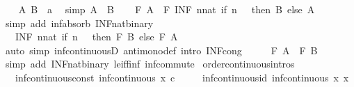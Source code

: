 \begin{isabellebody}
%
\isadelimproof
%
\endisadelimproof
%
\isatagproof
{}\isamarkupfalse%
\isanewline
\ \ \isamarkupfalse%
\ A\ B\ {\isacharcolon}{\isacharcolon}\ {\isachardoublequoteopen}{\isacharprime}a{\isachardoublequoteclose}\ \isamarkupfalse%
\ {\isacharbrackleft}simp{\isacharbrackright}{\isacharcolon}\ {\isachardoublequoteopen}A\ {\isasymle}\ B{\isachardoublequoteclose}\isanewline
\ \ \isamarkupfalse%
\ {\isachardoublequoteopen}F\ A\ {\isacharequal}\ F\ {\isacharparenleft}INF\ n{\isacharcolon}{\isacharcolon}nat{\isachardot}\ if\ n\ {\isacharequal}\ {}\ then\ B\ else\ A{\isacharparenright}{\isachardoublequoteclose}\isanewline
\ \ \ \ \isamarkupfalse%
\ {\isacharparenleft}simp\ add{\isacharcolon}\ inf{\isacharunderscore}absorb{}\ INF{\isacharunderscore}nat{\isacharunderscore}binary{\isacharparenright}\isanewline
\ \ \isamarkupfalse%
\ \isamarkupfalse%
\ {\isachardoublequoteopen}{\isasymdots}\ {\isacharequal}\ {\isacharparenleft}INF\ n{\isacharcolon}{\isacharcolon}nat{\isachardot}\ if\ n\ {\isacharequal}\ {}\ then\ F\ B\ else\ F\ A{\isacharparenright}{\isachardoublequoteclose}\isanewline
\ \ \ \ \isamarkupfalse%
\ {\isacharparenleft}auto\ simp{\isacharcolon}\ inf{\isacharunderscore}continuousD\ antimono{\isacharunderscore}def\ intro{\isacharbang}{\isacharcolon}\ INF{\isacharunderscore}cong{\isacharparenright}\isanewline
\ \ \isamarkupfalse%
\ \isamarkupfalse%
\ {\isachardoublequoteopen}F\ A\ {\isasymle}\ F\ B{\isachardoublequoteclose}\isanewline
\ \ \ \ \isamarkupfalse%
\ {\isacharparenleft}simp\ add{\isacharcolon}\ INF{\isacharunderscore}nat{\isacharunderscore}binary\ le{\isacharunderscore}iff{\isacharunderscore}inf\ inf{\isacharunderscore}commute{\isacharparenright}\isanewline
{}\isamarkupfalse%
%
\endisatagproof
{\isafoldproof}%
%
\isadelimproof
\isanewline
%
\endisadelimproof
\isanewline
{}\isamarkupfalse%
\ {\isacharbrackleft}order{\isacharunderscore}continuous{\isacharunderscore}intros{\isacharbrackright}{\isacharcolon}\isanewline
\ \ \ inf{\isacharunderscore}continuous{\isacharunderscore}const{\isacharcolon}\ {\isachardoublequoteopen}inf{\isacharunderscore}continuous\ {\isacharparenleft}{\isasymlambda}x{\isachardot}\ c{\isacharparenright}{\isachardoublequoteclose}\isanewline
\ \ \ \ \ inf{\isacharunderscore}continuous{\isacharunderscore}id{\isacharcolon}\ {\isachardoublequoteopen}inf{\isacharunderscore}continuous\ {\isacharparenleft}{\isasymlambda}x{\isachardot}\ x{\isacharparenright}{\isachardoublequoteclose}\isanewline

\end{isabellebody}
